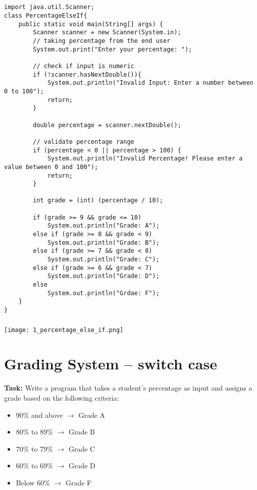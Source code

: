 \documentclass[12pt,a4paper]{article}
\begin{document}
\subsection{}
\begin{lstlisting}
import java.util.Scanner;
class PercentageElseIf{
    public static void main(String[] args) {
        Scanner scanner = new Scanner(System.in);
        // taking percentage from the end user
        System.out.print("Enter your percentage: ");
    
        // check if input is numeric
        if (!scanner.hasNextDouble()){
            System.out.println("Invalid Input: Enter a number between 0 to 100");
            return;
        }
    
        double percentage = scanner.nextDouble();
    
        // validate percentage range
        if (percentage < 0 || percentage > 100) {
            System.out.println("Invalid Percentage! Please enter a value between 0 and 100");
            return;
        }
    
        int grade = (int) (percentage / 10);
    
        if (grade >= 9 && grade <= 10) 
            System.out.println("Grade: A");
        else if (grade >= 8 && grade < 9) 
            System.out.println("Grade: B");
        else if (grade >= 7 && grade < 8)
            System.out.println("Grade: C");
        else if (grade >= 6 && grade < 7)
            System.out.println("Grade: D");
        else
            System.out.println("Grdae: F");
    }
}
\end{lstlisting}

\subsubsection{}
\begin{center}
    \texttt{[image: 1\_percentage\_else\_if.png]}
\end{center}

\section{Grading System -- switch case}
\textbf{Task:} Write a program that takes a student's percentage as input and assigns a grade based on the
following criteria:
\begin{itemize}
    \item 90\% and above $\rightarrow$ Grade A
    \item 80\% to 89\% $\rightarrow$ Grade B
    \item 70\% to 79\% $\rightarrow$ Grade C
    \item 60\% to 69\% $\rightarrow$ Grade D
    \item Below 60\% $\rightarrow$ Grade F
\end{itemize}
\end{document}
